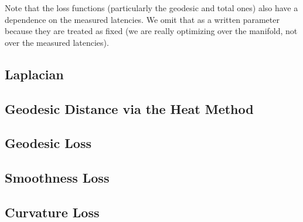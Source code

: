 \documentclass[10pt]{article}
\begin{document}
	Note that the loss functions (particularly the geodesic and total ones) also have a dependence on the measured latencies. We omit that as a written parameter because they are treated as fixed (we are really optimizing over the manifold, not over the measured latencies).

	\subsection{Laplacian}
	

	\subsection{Geodesic Distance via the Heat Method}
	

	\subsection{Geodesic Loss}
	

	\subsection{Smoothness Loss}
	

	\subsection{Curvature Loss}
	
\end{document}
